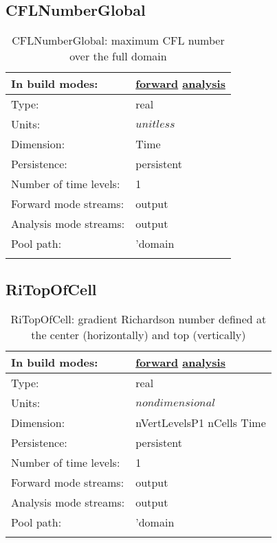 \subsection[CFLNumberGlobal]{CFLNumberGlobal}
\label{subsec:var_sec_diagnostics_CFLNumberGlobal}
\begin{center}
\begin{longtable}{| p{2.0in} | p{4.0in} |}
        \hline 
        In build modes: & \hyperref[subsec:forward_var_tab_diagnostics]{forward} \hyperref[subsec:analysis_var_tab_diagnostics]{analysis} \\
        \hline 
        Type: & real \\
        \hline 
        Units: & $unitless$ \\
        \hline 
        Dimension: & Time \\
        \hline 
        Persistence: & persistent \\
        \hline 
        Number of time levels: & 1 \\
        \hline 
		 Forward mode streams: &  output \\
        \hline 
		 Analysis mode streams: &  output \\
        \hline 
            Pool path: & 'domain %
 \\
		 \hline 
    \caption{CFLNumberGlobal: maximum CFL number over the full domain}
\end{longtable}
\end{center}
\subsection[RiTopOfCell]{RiTopOfCell}
\label{subsec:var_sec_diagnostics_RiTopOfCell}
\begin{center}
\begin{longtable}{| p{2.0in} | p{4.0in} |}
        \hline 
        In build modes: & \hyperref[subsec:forward_var_tab_diagnostics]{forward} \hyperref[subsec:analysis_var_tab_diagnostics]{analysis} \\
        \hline 
        Type: & real \\
        \hline 
        Units: & $nondimensional$ \\
        \hline 
        Dimension: & nVertLevelsP1 nCells Time \\
        \hline 
        Persistence: & persistent \\
        \hline 
        Number of time levels: & 1 \\
        \hline 
		 Forward mode streams: &  output \\
        \hline 
		 Analysis mode streams: &  output \\
        \hline 
            Pool path: & 'domain %
 \\
		 \hline 
    \caption{RiTopOfCell: gradient Richardson number defined at the center (horizontally) and top (vertically)}
\end{longtable}
\end{center}
